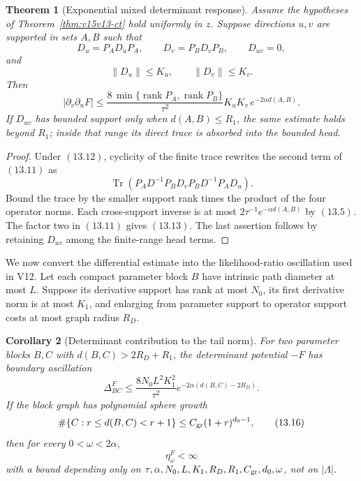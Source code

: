 \documentclass[11pt]{article}
\newtheorem{theorem}{Theorem}[section]
\newtheorem{corollary}[theorem]{Corollary}
\theoremstyle{remark}
\begin{document}
\begin{theorem}[Exponential mixed determinant response]
\label{thm:v15v13-det-hessian}
Assume the hypotheses of
Theorem~\ref{thm:v15v13-ct} hold uniformly in \(z\).
Suppose directions \(u,v\) are supported in sets \(A,B\) such
that
\[
 D_u=P_AD_uP_A,\qquad D_v=P_BD_vP_B,\qquad D_{uv}=0,          \tag{13.12}
\]
and
\[
 \|D_u\|\le K_u,\qquad\|D_v\|\le K_v.
\]
Then
\[
 \boxed{
 |\partial_v\partial_uF|
 \le
 \frac{8\,\min\{\operatorname{rank}P_A,
                 \operatorname{rank}P_B\}}
      {\tau^2}
 K_uK_v\,e^{-2\alpha d(A,B)}.}                              \tag{13.13}
\]
If \(D_{uv}\) has bounded support only when
\(d(A,B)\le R_1\), the same estimate holds beyond \(R_1\);
inside that range its direct trace is absorbed into the bounded
head.
\end{theorem}

\begin{proof}
Under \((13.12)\), cyclicity of the finite trace rewrites the
second term of \((13.11)\) as
\[
 \operatorname{Tr}\left(
 P_AD^{-1}P_BD_vP_BD^{-1}P_AD_u
 \right).                                                    \tag{13.14}
\]
Bound the trace by the smaller support rank times the product of
the four operator norms.  Each cross-support inverse is at most
\(2\tau^{-1}e^{-\alpha d(A,B)}\) by \((13.5)\).
The factor two in \((13.11)\) gives \((13.13)\).
The last assertion follows by retaining \(D_{uv}\) among the
finite-range head terms.
\end{proof}

We now convert the differential estimate into the likelihood-ratio
oscillation used in V12.  Let each compact parameter block \(B\)
have intrinsic path diameter at most \(L\).  Suppose its derivative
support has rank at most \(N_0\), its first derivative norm is at
most \(K_1\), and enlarging from parameter support to operator
support costs at most graph radius \(R_D\).

\begin{corollary}[Determinant contribution to the tail norm]
\label{cor:v15v13-tail}
For two parameter blocks \(B,C\) with
\(d(B,C)>2R_D+R_1\), the determinant potential
\(-F\) has boundary oscillation
\[
 \boxed{
 \Delta_{BC}^{F}
 \le
 \frac{8N_0L^2K_1^2}{\tau^2}
 e^{-2\alpha(d(B,C)-2R_D)}.}                                \tag{13.15}
\]
If the block graph has polynomial sphere growth
\[
 \#\{C:r\le d(B,C)<r+1\}\le C_{\rm gr}(1+r)^{d_0-1},          \tag{13.16}
\]
then for every \(0<\omega<2\alpha\),
\[
 \eta_\omega^{F}<\infty                                     \tag{13.17}
\]
with a bound depending only on
\(\tau,\alpha,N_0,L,K_1,R_D,R_1,C_{\rm gr},d_0,\omega\),
not on \(|\Lambda|\).
\end{corollary}
\end{document}

